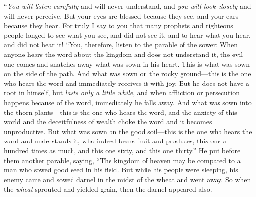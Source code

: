 \begin{biblechapter}
\verse “\textit{You will listen carefully} and will never understand, 
and \textit{you will look closely} and will never perceive.
\verse But your eyes are blessed because they see, and your ears because they hear.
\verse For truly I say to you that many prophets and righteous people longed to see what you see, and did not see it, and to hear what you hear, and did not hear it!
 “You, therefore, listen to the parable of the sower:
\verse When anyone hears the word about the kingdom and does not understand it, the evil one comes and snatches away what was sown in his heart. This is what was sown on the side of the path.
\verse And what was sown on the rocky ground—this is the one who hears the word and immediately receives it with joy.
\verse But he does not have a root in himself, but \textit{lasts only a little while}, and when affliction or persecution happens because of the word, immediately he falls away.
\verse And what was sown into the thorn plants—this is the one who hears the word, and the anxiety of this world and the deceitfulness of wealth choke the word and it becomes unproductive.
\verse But what was sown on the good soil—this is the one who hears the word and understands it, who indeed bears fruit and produces, this one a hundred times as much, and this one sixty, and this one thirty.”
 He put before them another parable, saying, “The kingdom of heaven may be compared to a man who sowed good seed in his field.
\verse But while his people were sleeping, his enemy came and sowed darnel in the midst of the wheat and went away.
\verse So when the \textit{wheat} sprouted and yielded grain, then the darnel appeared also.

\end{biblechapter}
